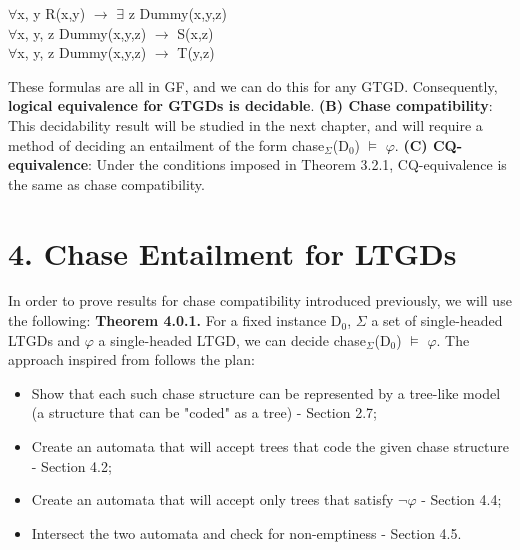 \documentclass[11pt, a4paper, dvipsnames]{article}
\begin{document}
\begin{center}
$\forall$x, y R(x,y) $\rightarrow$ $\exists$ z Dummy(x,y,z)\\
$\forall$x, y, z Dummy(x,y,z) $\rightarrow$ S(x,z)\\
$\forall$x, y, z Dummy(x,y,z) $\rightarrow$ T(y,z)
\end{center}
These formulas are all in GF, and we can do this for any GTGD.\newline
Consequently, \textbf{logical equivalence for GTGDs is decidable}. \newline
\textbf{(B) Chase compatibility}:
This decidability result will be studied in the next chapter, and will require a method of deciding an entailment of the form chase$_{\Sigma}$(D$_{0}$) $\vDash$ $\varphi$.\newline
\textbf{(C) CQ-equivalence}: Under the conditions imposed in Theorem 3.2.1, CQ-equivalence is the same as chase compatibility.  

\newpage

\section{4. Chase Entailment for LTGDs}
In order to prove results for chase compatibility introduced previously, we will use the following:\newline
\textbf{Theorem 4.0.1.} For a fixed instance D$_{0}$, $\Sigma$ a set of single-headed LTGDs and $\varphi$ a single-headed LTGD, we can decide chase$_{\Sigma}$(D$_{0}$) $\vDash$ $\varphi$. \newline
The approach inspired from \cite{decidable} follows the plan:
\begin{itemize}
	\item Show that each such chase structure can be represented by a tree-like model (a structure that can be "coded" as a tree) - Section 2.7;
	\item Create an automata that will accept trees that code the given chase structure - Section 4.2;
	\item Create an automata that will accept only trees that satisfy $\neg \varphi$ - Section 4.4;
	\item Intersect the two automata and check for non-emptiness - Section 4.5.
\end{itemize}
\end{document}
